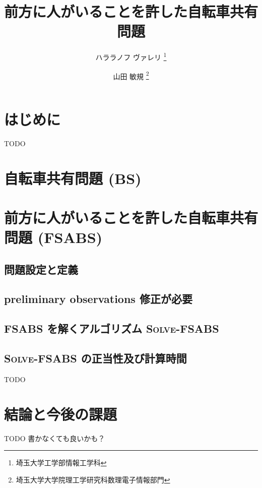 \documentclass{la-preprint}
\title{前方に人がいることを許した自転車共有問題}
\author{
	ハララノフ ヴァレリ \thanks{埼玉大学工学部情報工学科} \and
	山田 敏規 \thanks{埼玉大学大学院理工学研究科数理電子情報部門} \and
}
\date{}
\begin{document}
\section{はじめに}
TODO
\section{自転車共有問題 (BS)}

\section{前方に人がいることを許した自転車共有問題 (FSABS) }
\subsection{問題設定と定義}

\subsection{preliminary observations {\color{red}修正が必要}}

\subsection{FSABS を解くアルゴリズム \textsc{Solve-FSABS}}

\subsection{\textsc{Solve-FSABS} の正当性及び計算時間}
TODO
\section{結論と今後の課題}
TODO
書かなくても良いかも？

\end{document}

